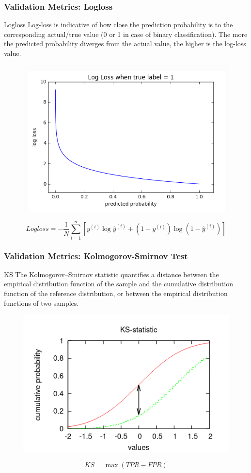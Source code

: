 \documentclass{beamer}
\begin{document}
\begin{frame}
\frametitle{Validation Metrics: Logloss}
\begin{block}{Logloss}
Log-loss is indicative of how close the prediction probability is to the corresponding actual/true value (0 or 1 in case of binary classification). The more the predicted probability diverges from the actual value, the higher is the log-loss value.
\end{block}
\begin{figure}[h]
 \centering
 \includegraphics[scale=0.25]{logloss_grap.png}
\end{figure}
\begin{equation*}
    Logloss = -\frac{1}{N}\sum_{i=1}^n[y^{(i)}\log \hat{y}^{(i)} + (1-y^{(i)})\log(1-\hat{y}^{(i)})]
\end{equation*}
\end{frame}
\begin{frame}
\frametitle{Validation Metrics: Kolmogorov-Smirnov Test}
\begin{block}{KS}
The Kolmogorov–Smirnov statistic quantifies a distance between the empirical distribution function of the sample and the cumulative distribution function of the reference distribution, or between the empirical distribution functions of two samples.
\end{block}
\begin{figure}[h]
 \centering
 \includegraphics[scale=0.35]{ks_statis.png}
\end{figure}
\begin{equation*}
    KS = \max(TPR - FPR)
\end{equation*}
\end{frame}
\end{document}

